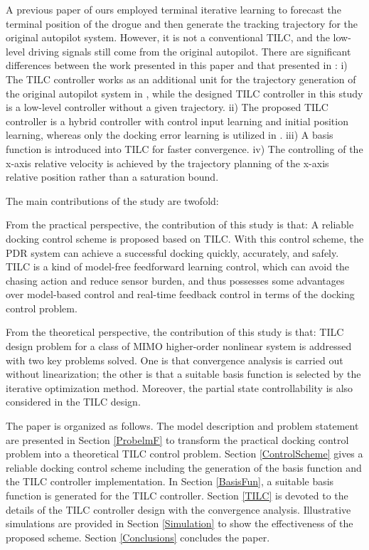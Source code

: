 A previous paper of ours \cite{dai2018terminal} employed terminal iterative
learning to forecast the terminal position of the drogue and then generate the
tracking trajectory for the original autopilot system. However, it is not a
conventional TILC, and the low-level driving signals still come from the
original autopilot. There are significant differences between the work
presented in this paper and that presented in \cite{dai2018terminal}: i) The
TILC controller works as an additional unit for the trajectory generation of
the original autopilot system in \cite{dai2018terminal}, while the designed
TILC controller in this study is a low-level controller without a given
trajectory. ii) The proposed TILC controller is a hybrid controller with
control input learning and initial position learning, whereas only the docking
error learning is utilized in \cite{dai2018terminal}. iii) A basis function is
introduced into TILC for faster convergence. iv) The controlling of the x-axis
relative velocity is achieved by the trajectory planning of the x-axis
relative position rather than a saturation bound.

The main contributions of the study are twofold:

From the practical perspective, the contribution of this study is that: A
reliable docking control scheme is proposed based on TILC. With this control
scheme, the PDR system can achieve a successful docking quickly, accurately,
and safely. TILC is a kind of model-free feedforward learning control, which
can avoid the chasing action and reduce sensor burden, and thus possesses some
advantages over model-based control and real-time feedback control in terms of
the docking control problem.

From the theoretical perspective, the contribution of this study is that: TILC
design problem for a class of MIMO higher-order nonlinear system is addressed
with two key problems solved. One is that convergence analysis is carried out
without linearization; the other is that a suitable basis function is selected
by the iterative optimization method. Moreover, the partial state
controllability is also considered in the TILC design.

The paper is organized as follows. The model description and problem statement
are presented in Section \ref{ProbelmF} to transform the practical docking
control problem into a theoretical TILC control problem. Section
\ref{ControlScheme} gives a reliable docking control scheme including the
generation of the basis function and the TILC controller implementation. In
Section \ref{BasisFun}, a suitable basis function is generated for the TILC
controller. Section \ref{TILC} is devoted to the details of the TILC
controller design with the convergence analysis. Illustrative simulations are
provided in Section \ref{Simulation} to show the effectiveness of the proposed
scheme. Section \ref{Conclusions} concludes the paper.

